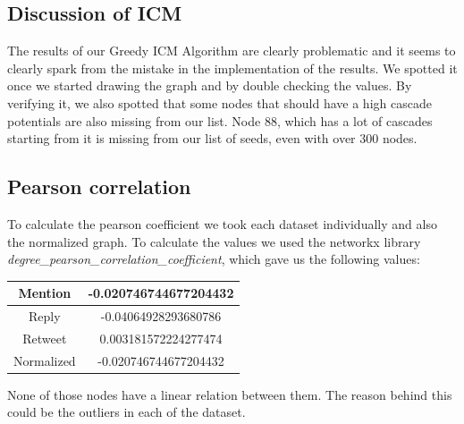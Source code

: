 \subsection{Discussion of ICM}

The results of our Greedy ICM Algorithm are clearly problematic and it seems to clearly spark from the mistake in the implementation of the results. We spotted it once we started drawing the graph and by double checking the values. By verifying it, we also spotted that some nodes that should have a high cascade potentials are also missing from our list. Node 88, which has a lot of cascades starting from it is missing from our list of seeds, even with over 300 nodes.

\subsection{Pearson correlation}
To calculate the pearson coefficient we took each dataset individually and also the normalized graph.
To calculate the values we used the networkx library \textit{degree\_pearson\_correlation\_coefficient}, which gave us the following values:
\begin{center}
 \begin{tabular}{||c | c ||} 
 \hline
 Mention & -0.020746744677204432 \\
 \hline
 Reply & -0.04064928293680786\\ 
 \hline
 Retweet & 0.003181572224277474\\ 
 \hline
 Normalized & -0.020746744677204432 \\ 
 \hline
\end{tabular}
\end{center}
None of those nodes have a linear relation between them. The reason behind this could be the outliers in each of the dataset.
